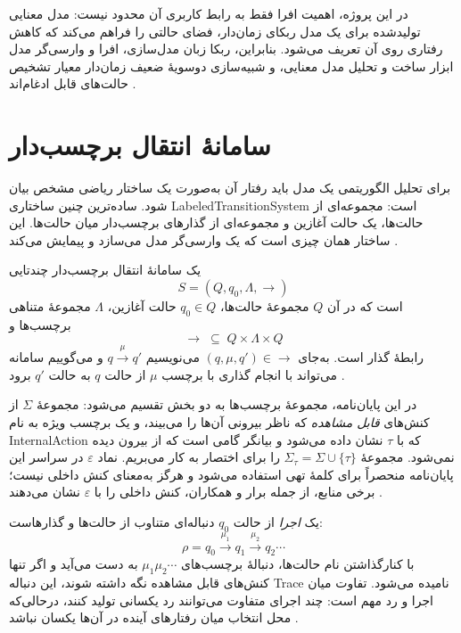 در این پروژه، اهمیت افرا فقط به رابط کاربری آن محدود نیست: مدل معنایی تولیدشده برای یک مدل ربکای زمان‌دار، فضای حالتی را فراهم می‌کند که کاهش رفتاری روی آن تعریف می‌شود. بنابراین، ربکا زبان مدل‌سازی، افرا و وارسی‌گر مدل ابزار ساخت و تحلیل مدل معنایی، و شبیه‌سازی دوسویهٔ ضعیف زمان‌دار معیار تشخیص حالت‌های قابل ادغام‌اند \cite{AfraWebsite2026,ReynierSangnier2009}.


\section{سامانهٔ انتقال برچسب‌دار}

برای تحلیل الگوریتمی یک مدل باید رفتار آن به‌صورت یک ساختار ریاضی مشخص بیان شود. ساده‌ترین چنین ساختاری \gls{LabeledTransitionSystem} است: مجموعه‌ای از حالت‌ها، یک حالت آغازین و مجموعه‌ای از گذارهای برچسب‌دار میان حالت‌ها. این ساختار همان چیزی است که یک وارسی‌گر مدل می‌سازد و پیمایش می‌کند \cite{BaierKatoen2008,Milner1989}.

\begin{definition}
\label{def:lts}
یک سامانهٔ انتقال برچسب‌دار چندتایی
\[
S=(Q,q_0,\Lambda,\rightarrow)
\]
است که در آن $Q$ مجموعهٔ حالت‌ها، $q_0\in Q$ حالت آغازین، $\Lambda$ مجموعهٔ متناهی برچسب‌ها و
\[
\rightarrow\;\subseteq\;Q\times\Lambda\times Q
\]
رابطهٔ گذار است. به‌جای $(q,\mu,q')\in\rightarrow$ می‌نویسیم $q\xrightarrow{\mu}q'$ و می‌گوییم سامانه می‌تواند با انجام گذاری با برچسب $\mu$ از حالت $q$ به حالت $q'$ برود \cite{BaierKatoen2008,Milner1989}.
\end{definition}

در این پایان‌نامه، مجموعهٔ برچسب‌ها به دو بخش تقسیم می‌شود: مجموعهٔ $\Sigma$ از کنش‌های \emph{قابل مشاهده} که ناظر بیرونی آن‌ها را می‌بیند، و یک برچسب ویژه به نام \gls{InternalAction} که با $\tau$ نشان داده می‌شود و بیانگر گامی است که از بیرون دیده نمی‌شود. مجموعهٔ $\Sigma_\tau=\Sigma\cup\{\tau\}$ را برای اختصار به کار می‌بریم. نماد $\varepsilon$ در سراسر این پایان‌نامه منحصراً برای کلمهٔ تهی استفاده می‌شود و هرگز به‌معنای کنش داخلی نیست؛ برخی منابع، از جمله برار و همکاران، کنش داخلی را با $\varepsilon$ نشان می‌دهند \cite{BerardEtAl2008,Milner1989}.

یک \emph{اجرا} از حالت $q_0$ دنباله‌ای متناوب از حالت‌ها و گذارهاست:
\[
\rho=q_0\xrightarrow{\mu_1}q_1\xrightarrow{\mu_2}q_2\cdots
\]
با کنارگذاشتن نام حالت‌ها، دنبالهٔ برچسب‌های $\mu_1\mu_2\cdots$ به دست می‌آید و اگر تنها کنش‌های قابل مشاهده نگه داشته شوند، این دنباله \gls{Trace} نامیده می‌شود. تفاوت میان اجرا و رد مهم است: چند اجرای متفاوت می‌توانند رد یکسانی تولید کنند، درحالی‌که محل انتخاب میان رفتارهای آینده در آن‌ها یکسان نباشد \cite{BaierKatoen2008,GlabbeekWeijland1996}.

